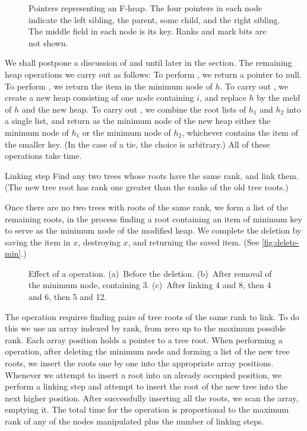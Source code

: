 \begin{figure}
    \caption{Pointers representing an F-heap. The four pointers in each node indicate
    the left sibling, the parent, some child, and the right sibling. The middle field
    in each node is its key. Ranks and mark bits are not shown.}
    \label{fig:pointers}
\end{figure}

We shall postpone a discussion of  and  until later in
the section. The remaining heap operations we carry out as follows: To perform
, we return a pointer to null. To perform , we
return the item in the minimum node of \(h\). To carry out , we
create a new heap consisting of one node containing \(i\), and replace \(h\) by the
meld of \(h\) and the new heap. To carry out , we combine the
root lists of \(h_1\) and \(h_2\) into a single list, and return as the minimum node
of the new heap either the minimum node of \(h_1\) or the minimum node of \(h_2\),
whichever contains the item of the smaller key. (In the case of a tie, the choice is
arbitrary.) All of these operations take  time.

\begin{step}{Linking step}
	Find any two trees whose roots have the same rank, and link them. (The new tree
	root has rank one greater than the ranks of the old tree roots.)
\end{step}

Once there are no two trees with roots of the same rank, we form a list of the
remaining roots, in the process finding a root containing an item of minimum key to
serve as the minimum node of the modified heap. We complete the deletion by saving
the item in \(x\), destroying \(x\), and returning the saved item. (See
\autoref{fig:delete-min}.)

\begin{figure}
    \caption{Effect of a  operation. (a)~Before the deletion.
    (b)~After removal of the minimum node, containing 3. (c)~After linking 4 and 8,
    then 4 and 6, then 5 and 12.}
    \label{fig:delete-min}
\end{figure}

The  operation requires finding pairs of tree roots of the same rank
to link. To do this we use an array indexed by rank, from zero up to the maximum
possible rank. Each array position holds a pointer to a tree root. When performing
a  operation, after deleting the minimum node and forming a list of
the new tree roots, we insert the roots one by one into the appropriate array
positions. Whenever we attempt to insert a root into an already occupied position, we
perform a linking step and attempt to insert the root of the new tree into the next
higher position. After successfully inserting all the roots, we scan the array,
emptying it. The total time for the  operation is proportional to the
maximum rank of any of the nodes manipulated plus the number of linking steps.

